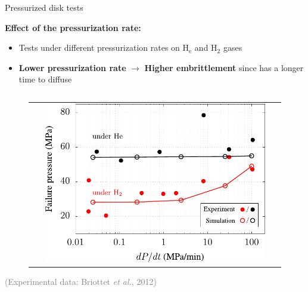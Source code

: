 \documentclass[9pt]{beamer}
\begin{document}
\begin{frame}{Pressurized disk tests}

    \textbf{Effect of the pressurization rate:}
    \vspace{0.15cm}

    \begin{itemize}
        \item Tests under different pressurization rates on H$_{\textrm{e}}$ and H$_2$ gases
        \vspace{0.15cm}
        \item \textbf{Lower pressurization rate} $\rightarrow$ \textbf{Higher embrittlement} since has a longer time to diffuse
    \end{itemize}

    \begin{columns}

        \begin{column}{0.45\textwidth}

            \begin{figure}
                \begin{tabular}{c}
                    \includegraphics[width=0.9\textwidth]{Images/fig_disk_Pr_edt.pdf}\\
                \end{tabular}
            \end{figure}

            \centering \hspace{0.8cm} \scriptsize \textcolor{gray}{(Experimental data: Briottet \textit{et al.}, 2012)}

        \end{column}
    

\end{columns}
\end{frame}
\end{document}
